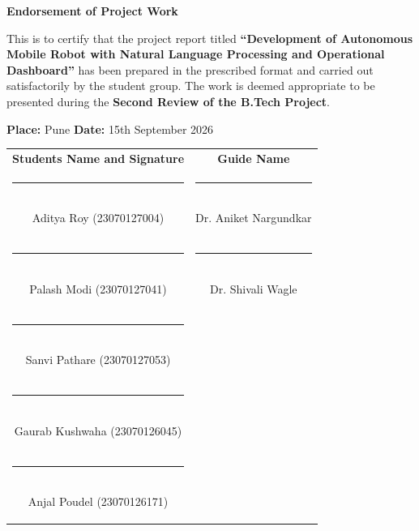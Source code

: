 \newpage
\thispagestyle{plain}

\begin{center}
    {\fontsize{16}{20}\selectfont\textbf{Endorsement of Project Work}}\\[1.2cm]
\end{center}

\vspace{0.5cm}

\noindent
This is to certify that the project report titled 
\textbf{``Development of Autonomous Mobile Robot with Natural Language Processing and Operational Dashboard''} has been prepared in the prescribed format 
and carried out satisfactorily by the student group. 
The work is deemed appropriate to be presented during the 
\textbf{Second Review of the B.Tech Project}.

\vspace{1.5cm}

\noindent
\textbf{Place:} Pune \hfill \textbf{Date:} 15th September 2026 

\vspace{1.5cm}

\renewcommand{\arraystretch}{2.0} %
\begin{center}
\begin{tabular}{p{7cm} p{7cm}}
    \multicolumn{1}{c}{\textbf{Students Name and Signature}} & 
    \multicolumn{1}{c}{\textbf{Guide Name}} \\[1cm]

    \multicolumn{1}{c}{\parbox{7cm}{\centering \rule{6cm}{0.3pt} \\ Aditya Roy (23070127004)}} &
    \multicolumn{1}{c}{\parbox{7cm}{\centering \rule{6cm}{0.3pt} \\ Dr. Aniket Nargundkar}} \\[1cm]

    \multicolumn{1}{c}{\parbox{7cm}{\centering \rule{6cm}{0.3pt} \\ Palash Modi (23070127041)}} &
    \multicolumn{1}{c}{\parbox{7cm}{\centering \rule{6cm}{0.3pt} \\ Dr. Shivali Wagle }} \\[1cm]

    \multicolumn{1}{c}{\parbox{7cm}{\centering \rule{6cm}{0.3pt} \\ Sanvi Pathare (23070127053)}} &
    \multicolumn{1}{c}{} \\[1cm]

    \multicolumn{1}{c}{\parbox{7cm}{\centering \rule{6cm}{0.3pt} \\ Gaurab Kushwaha (23070126045)}} &
    \multicolumn{1}{c}{} \\[1cm]

    \multicolumn{1}{c}{\parbox{7cm}{\centering \rule{6cm}{0.3pt} \\ Anjal Poudel (23070126171)}} &
    \multicolumn{1}{c}{} \\
\end{tabular}
\end{center}

\vspace{2cm}

\vspace{2cm}


